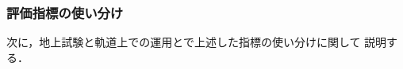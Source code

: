 \documentclass[11pt]{article}
\begin{document}

\subsubsection{評価指標の使い分け}
次に，地上試験と軌道上での運用とで上述した指標の使い分けに関して
説明する．

\end{document}
